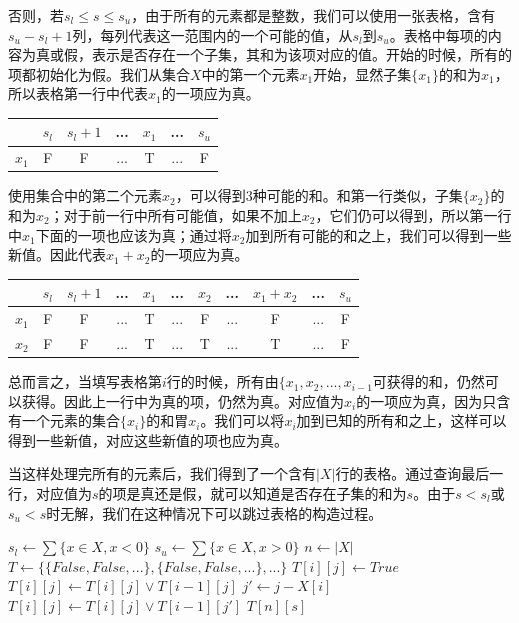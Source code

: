 \documentclass[UTF8]{article}
\begin{document}
否则，若$s_l \leq s \leq s_u$，由于所有的元素都是整数，我们可以使用一张表格，含有$s_u - s_l + 1$列，每列代表这一范围内的一个可能的值，从$s_l$到$s_u$。表格中每项的内容为真或假，表示是否存在一个子集，其和为该项对应的值。开始的时候，所有的项都初始化为假。我们从集合$X$中的第一个元素$x_1$开始，显然子集$\{x_1\}$的和为$x_1$，所以表格第一行中代表$x_1$的一项应为真。

\begin{tabular}{|c|c|c|c|c|c|c|}
\hline
 & $s_l$ & $s_l+1$ & ... & $x_1$ & ... & $s_u$ \\
\hline
$x_1$ & F & F & ... & T & ... & F \\
\hline
\end{tabular}

使用集合中的第二个元素$x_2$，可以得到3种可能的和。和第一行类似，子集$\{x_2\}$的和为$x_2$；对于前一行中所有可能值，如果不加上$x_2$，它们仍可以得到，所以第一行中$x_1$下面的一项也应该为真；通过将$x_2$加到所有可能的和之上，我们可以得到一些新值。因此代表$x_1 + x_2$的一项应为真。

\begin{tabular}{|c|c|c|c|c|c|c|c|c|c|c|}
\hline
 & $s_l$ & $s_l+1$ & ... & $x_1$ & ... & $x_2$ & ... & $x_1 + x_2$ & ... & $s_u$ \\
\hline
$x_1$ & F & F & ... & T & ... & F & ... & F & ... & F \\
\hline
$x_2$ & F & F & ... & T & ... & T & ... & T & ... & F \\
\hline
\end{tabular}

总而言之，当填写表格第$i$行的时候，所有由$\{x_1, x_2, ..., x_{i-1}$可获得的和，仍然可以获得。因此上一行中为真的项，仍然为真。对应值为$x_i$的一项应为真，因为只含有一个元素的集合$\{x_i\}$的和胃$x_i$。我们可以将$x_i$加到已知的所有和之上，这样可以得到一些新值，对应这些新值的项也应为真。

当这样处理完所有的元素后，我们得到了一个含有$|X|$行的表格。通过查询最后一行，对应值为$s$的项是真还是假，就可以知道是否存在子集的和为$s$。由于$s < s_l$或$s_u < s$时无解，我们在这种情况下可以跳过表格的构造过程。

\begin{algorithmic}[1]
  \State $s_l \gets \sum \{x \in X, x < 0\}$
  \State $s_u \gets \sum \{x \in X, x > 0\}$
  \State $n \gets |X|$
  \State $T \gets \{\{False, False, ...\}, \{False, False, ...\}, ...\}$ 
        \State $T[i][j] \gets True$
      \EndIf
        \State $T[i][j] \gets T[i][j] \lor T[i-1][j]$
        \State $j' \gets j - X[i]$
          \State $T[i][j] \gets T[i][j] \lor T[i-1][j']$
        \EndIf
      \EndIf
    \EndFor
  \EndFor
  \State \Return $T[n][s]$
\EndFunction
\end{algorithmic}
\end{document}
